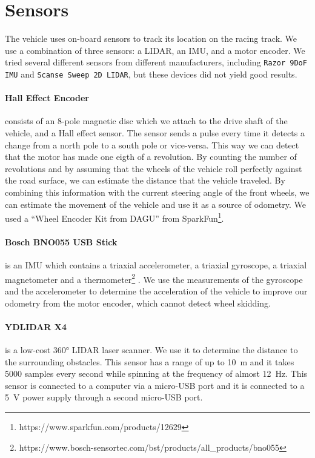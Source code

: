 \section{Sensors}

The vehicle uses on-board sensors to track its location on the racing track. We use a combination of three sensors: a \gls{LIDAR}, an \gls{IMU}, and a motor encoder. We tried several different sensors from different manufacturers, including \verb|Razor 9DoF IMU| and \verb|Scanse Sweep 2D LIDAR|, but these devices did not yield good results. 

\paragraph{Hall Effect Encoder} consists of an 8-pole magnetic disc which we attach to the drive shaft of the vehicle, and a Hall effect sensor. The sensor sends a pulse every time it detects a change from a north pole to a south pole or vice-versa. This way we can detect that the motor has made one eigth of a revolution. By counting the number of revolutions and by assuming that the wheels of the vehicle roll perfectly against the road surface, we can estimate the distance that the vehicle traveled. By combining this information with the current steering angle of the front wheels, we can estimate the movement of the vehicle and use it as a source of odometry. We used a ``Wheel Encoder Kit from DAGU'' from SparkFun\footnote{https://www.sparkfun.com/products/12629}.

\paragraph{Bosch BNO055 USB Stick} is an \gls{IMU} which contains a triaxial accelerometer, a triaxial gyroscope, a triaxial magnetometer and a thermometer\footnote{https://www.bosch-sensortec.com/bst/products/all\_products/bno055} . We use the measurements of the gyroscope and the accelerometer to determine the acceleration of the vehicle to improve our odometry from the motor encoder, which cannot detect wheel skidding.

\paragraph{YDLIDAR X4} is a low-cost \ang{360} \gls{LIDAR} laser scanner. We use it to determine the distance to the surrounding obstacles. This sensor has a range of up to \SI{10}{\meter} and it takes \num{5000} samples every second while spinning at the frequency of almost \SI{12}{\hertz}. This sensor is connected to a computer via a micro-USB port and it is connected to a \SI{5}{\volt} power supply through a second micro-USB port.


